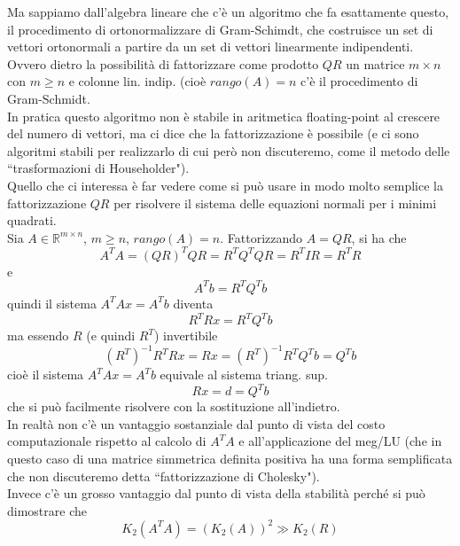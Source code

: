 Ma sappiamo dall'algebra lineare che c'è un algoritmo che fa esattamente questo, il procedimento di ortonormalizzare di Gram-Schimdt, che costruisce un set di vettori ortonormali a partire da un set di vettori linearmente indipendenti.\\
Ovvero dietro la possibilità di fattorizzare come prodotto $QR$ un matrice $m\times n$ con $m\geq n$ e colonne lin. indip. (cioè $rango(A)=n$ c'è il procedimento di Gram-Schmidt. \\
In pratica questo algoritmo non è stabile in aritmetica floating-point al crescere del numero di vettori, ma ci dice che la fattorizzazione è possibile (e ci sono algoritmi stabili per realizzarlo di cui però non discuteremo, come il metodo delle ``trasformazioni di Householder").\\
Quello che ci interessa è far vedere come si può usare in modo molto semplice la fattorizzazione $QR$ per risolvere il sistema delle equazioni normali per i minimi quadrati. \\
Sia $A\in \mathbb{R}^{m\times n}$, $m\geq n$, $rango(A)=n$. Fattorizzando $A=QR$, si ha che
\begin{equation*}
    A^TA=(QR)^TQR=R^TQ^TQR=R^TIR=R^TR
\end{equation*}
e
\begin{equation*}
    A^Tb=R^TQ^Tb
\end{equation*}
quindi il sistema $A^TAx=A^Tb$ diventa 
\begin{equation*}
    R^TRx=R^TQ^Tb
\end{equation*}
ma essendo $R$ (e quindi $R^T$) invertibile
\begin{equation*}
    (R^T)^{-1}R^TRx=Rx=(R^T)^{-1}R^TQ^Tb=Q^Tb
\end{equation*}
cioè il sistema $A^TAx=A^Tb$ equivale al sistema triang. sup.
\begin{equation*}
    Rx=d=Q^Tb
\end{equation*}
che si può facilmente risolvere con la sostituzione all'indietro. \\
In realtà non c'è un vantaggio sostanziale dal punto di vista del costo computazionale rispetto al calcolo di $A^TA$ e all'applicazione del meg/LU (che in questo caso di una matrice simmetrica definita positiva ha una forma semplificata che non discuteremo detta ``fattorizzazione di Cholesky"). \\
Invece c'è un grosso vantaggio dal punto di vista della stabilità perché si può dimostrare che
\begin{equation*}
    K_2(A^TA)=(K_2(A))^2 \gg K_2(R)
\end{equation*}
